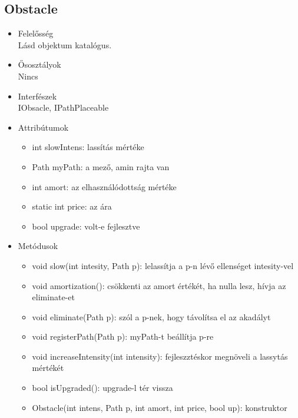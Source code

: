\subsection{Obstacle}
\begin{itemize}
\item Felelősség\\
Lásd objektum katalógus. 
\item Ősosztályok\\
Nincs
\item Interfészek\\
IObsacle, IPathPlaceable
\item Attribútumok
	\begin{itemize}
		\item int slowIntens: lassítás mértéke
		\item Path myPath: a mező, amin rajta van
		\item int amort: az elhasználódottság mértéke
		\item static int price: az ára
		\item bool upgrade: volt-e fejlesztve 
		
	\end{itemize}
\item Metódusok
	\begin{itemize}
		
		\item void slow(int intesity, Path p): lelassítja a p-n lévő ellenséget intesity-vel
		\item void amortization(): csökkenti az amort értékét, ha nulla lesz, hívja az eliminate-et
		\item void eliminate(Path p): szól a p-nek, hogy távolítsa el az akadályt
		\item void registerPath(Path p): myPath-t beállítja p-re
		\item void increaseIntensity(int intensity): fejleszztéskor megnöveli a lassytás mértékét
		\item bool isUpgraded(): upgrade-l tér vissza
		\item Obstacle(int intens, Path p, int amort, int price, bool up): konstruktor
		
		
	\end{itemize}
\end{itemize}
